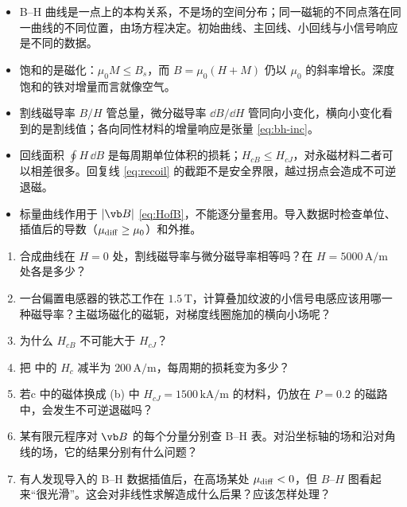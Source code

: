 \begin{takeaways}
\begin{itemize}
\item B--H 曲线是一点上的本构关系，不是场的空间分布；同一磁轭的不同点落在同一曲线的不同位置，由场方程决定。初始曲线、主回线、小回线与小信号响应是不同的数据。
\item 饱和的是磁化：$\mu_0M\le B_s$，而 $B=\mu_0(H+M)$ 仍以 $\mu_0$ 的斜率增长。深度饱和的铁对增量而言就像空气。
\item 割线磁导率 $B/H$ 管总量，微分磁导率 $\dd B/\dd H$ 管同向小变化，横向小变化看到的是割线值；各向同性材料的增量响应是张量 \eqref{eq:bh-inc}。
\item 回线面积 $\oint H\,\dd B$ 是每周期单位体积的损耗；$H_{cB}\le H_{cJ}$，对永磁材料二者可以相差很多。回复线 \eqref{eq:recoil} 的截距不是安全界限，越过拐点会造成不可逆退磁。
\item 标量曲线作用于 $|\vb B|$ \eqref{eq:HofB}，不能逐分量套用。导入数据时检查单位、插值后的导数（$\mu_{\rm diff}\ge\mu_0$）和外推。
\end{itemize}
\end{takeaways}

\begin{selfcheck}
\begin{enumerate}
\item 合成曲线在 $H=0$ 处，割线磁导率与微分磁导率相等吗？在 $H=5000\,\mathrm{A/m}$ 处各是多少？
\item 一台偏置电感器的铁芯工作在 $1.5\,\mathrm T$，计算叠加纹波的小信号电感应该用哪一种磁导率？主磁场磁化的磁轭，对梯度线圈施加的横向小场呢？
\item 为什么 $H_{cB}$ 不可能大于 $H_{cJ}$？
\item 把 中的 $H_c$ 减半为 $200\,\mathrm{A/m}$，每周期的损耗变为多少？
\item 若c 中的磁体换成 (b) 中 $H_{cJ}=1500\,\mathrm{kA/m}$ 的材料，仍放在 $P=0.2$ 的磁路中，会发生不可逆退磁吗？
\item 某有限元程序对 $\vb B$ 的每个分量分别查 B--H 表。对沿坐标轴的场和沿对角线的场，它的结果分别有什么问题？
\item 有人发现导入的 B--H 数据插值后，在高场某处 $\mu_{\rm diff}<0$，但 $B$--$H$ 图看起来“很光滑”。这会对非线性求解造成什么后果？应该怎样处理？
\end{enumerate}
\end{selfcheck}

